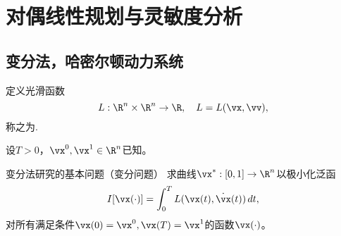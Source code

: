 \section{对偶线性规划与灵敏度分析}

\subsection{变分法，哈密尔顿动力系统}

\begin{frame}{\subsecname}
\begin{definition}[拉格朗日量]
定义光滑函数
\begin{equation}\label{eq:lagrange}
    L: \R^n \times \R^n \to \R, \quad
    L = L(\vx, \vv), 
\end{equation}
称之为. 
\end{definition}
\pause 

设$T > 0$，$\vx^0, \vx^1 \in \R^n$已知。
\begin{block}{变分法研究的基本问题（变分问题）}
求曲线$\vx^*: [0, 1] \to \R^n$以极小化泛函
\begin{equation}\label{eq:cvp}
    I[\vx(\cdot)] = \int_0^T L(\vx(t), \dot\vx(t))\,dt, 
\end{equation}
对所有满足条件$\vx(0)=\vx^0, \vx(T)=\vx^1$的函数$\vx(\cdot)$。
\end{block}
\end{frame}

